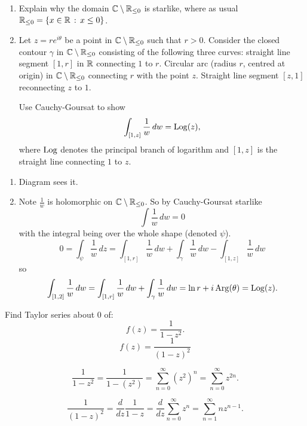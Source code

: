 \documentclass[10pt, a4paper]{article}
\begin{document}
\begin{problem}\phantom{}
    \begin{enumerate}[label = (\roman*)]
        \item Explain why the domain $\mathbb{C} \setminus \mathbb{R}_{\leq 0}$ is starlike,
        where as usual $\mathbb{R}_{\leq 0} = \{x \in \mathbb{R}\,:\,x \leq 0\}$.

        \item Let $z = re ^ {i\theta}$ be a point in $\mathbb{C} \setminus \mathbb{R}_{\leq 0}$ such that $r > 0$.
        Consider the closed contour $\gamma$ in $\mathbb{C} \setminus \mathbb{R}_{\leq 0}$ consisting of the following three curves:
        straight line segment $[1, r]$ in $\mathbb{R}$ connecting $1$ to $r$.
        Circular arc
        (radius $r$,
        centred at origin)
        in $\mathbb{C} \setminus \mathbb{R}_{\leq 0}$ connecting $r$ with the point $z$.
        Straight line segment $[z, 1]$ reconnecting $z$ to $1$.

        Use Cauchy-Goursat to show
        \[
        \int_{[1, z]}\frac{1}{w}\,dw = \operatorname{Log}(z),
        \]
        where $\operatorname{Log}$ denotes the principal branch of logarithm and $[1, z]$ is the straight line connecting $1$ to $z$.
    \end{enumerate}

    \begin{solution}\phantom{}
        \begin{enumerate}[label = (\roman*)]
            \item Diagram sees it.

            \item Note $\frac{1}{w}$ is holomorphic on $\mathbb{C} \setminus \mathbb{R}_{\leq 0}$.
            So by Cauchy-Goursat starlike
            \[
            \int\frac{1}{w}\,dw = 0
            \]
            with the integral being over the whole shape
            (denoted $\psi$).
            \[
            0 = \int_{\psi}\frac{1}{w}\,dz = \int_{[1, r]}\frac{1}{w}\,dw + \int_{\gamma}\frac{1}{w}\,dw - \int_{[1, z]}\frac{1}{w}\,dw
            \]
            so
            \[
            \int_{[1, 2]}\frac{1}{w}\,dw = \int_{[1, r]}\frac{1}{w}\,dw + \int_{\gamma}\frac{1}{w}\,dw = \ln{r} + i\operatorname{Arg}(\theta) = \operatorname{Log}(z).
            \]
        \end{enumerate}
    \end{solution}
\end{problem}

\begin{problem}
    Find Taylor series about $0$ of:
    \[
    f(z) = \frac{1}{1 - z ^ 2}.
    \]
    \[
    f(z) = \frac{1}{(1 - z) ^ 2}
    \]

    \begin{solution}
        \[
        \frac{1}{1 - z ^ 2} = \frac{1}{1 - (z ^ 2)} = \sum_{n = 0}^{\infty}(z ^ 2) ^ n = \sum_{n = 0}^{\infty}z ^ {2n}.
        \]

        \[
        \frac{1}{(1 - z) ^ 2} = \frac{d}{dz}\frac{1}{1 - z} = \frac{d}{dz}\sum_{n = 0}^{\infty}z ^ n = \sum_{n = 1}^{\infty}nz ^ {n - 1}.
        \]
    \end{solution}
\end{problem}
\end{document}
